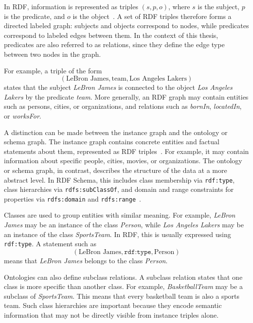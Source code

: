 \documentclass[a4paper,oneside,bibliography=totoc]{scrbook}
\begin{document}
In RDF, information is represented as triples $(s, p, o)$, where $s$ is the
subject, $p$ is the predicate, and $o$ is the object~\cite{cyganiak2014rdf}. A
set of RDF triples therefore forms a directed labeled graph: subjects and
objects correspond to nodes, while predicates correspond to labeled edges
between them. In the context of this thesis, predicates are also referred to as
relations, since they define the edge type between two nodes in the graph.

For example, a triple of the form
\[
(\text{LeBron James}, \text{team}, \text{Los Angeles Lakers})
\]
states that the subject \textit{LeBron James} is connected to the object
\textit{Los Angeles Lakers} by the predicate \textit{team}. More generally, an
RDF graph may contain entities such as persons, cities, or organizations, and
relations such as \textit{bornIn}, \textit{locatedIn}, or \textit{worksFor}.

A distinction can be made between the instance graph and the ontology or schema
graph. The instance graph contains concrete entities and factual statements
about them, represented as RDF triples~\cite{hogan_introduction_2022}. For
example, it may contain information about specific people, cities, movies, or
organizations. The ontology or schema graph, in contrast, describes the
structure of the data at a more abstract level. In RDF Schema, this includes
class membership via \texttt{rdf:type}, class hierarchies via
\texttt{rdfs:subClassOf}, and domain and range constraints for properties via
\texttt{rdfs:domain} and \texttt{rdfs:range}~\cite{cyganiak2014rdf,brickley_rdfs_2014}.

Classes are used to group entities with similar meaning. For example,
\textit{LeBron James} may be an instance of the class \textit{Person}, while
\textit{Los Angeles Lakers} may be an instance of the class \textit{SportsTeam}.
In RDF, this is usually expressed using \texttt{rdf:type}. A statement such as
\[
(\text{LeBron James}, \texttt{rdf:type}, \text{Person})
\]
means that \textit{LeBron James} belongs to the class \textit{Person}.

Ontologies can also define subclass relations. A subclass relation states that
one class is more specific than another class. For example,
\textit{BasketballTeam} may be a subclass of \textit{SportsTeam}. This means
that every basketball team is also a sports team. Such class hierarchies are
important because they encode semantic information that may not be directly
visible from instance triples alone.
\end{document}
